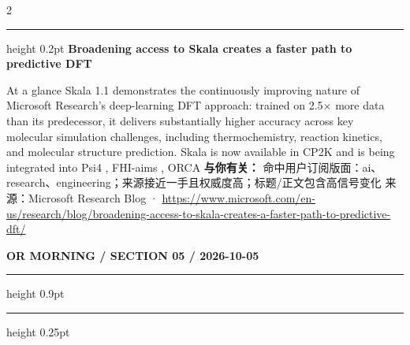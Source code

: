\documentclass[10.5pt]{ctexart}
\begin{document}
\begin{multicols}{2}
\vspace{2mm}
\hrule height 0.2pt
\vspace{2mm}
{\large\bfseries Broadening access to Skala creates a faster path to predictive DFT}\par
At a glance Skala 1.1 demonstrates the continuously improving nature of Microsoft Research’s deep-learning DFT approach: trained on 2.5× more data than its predecessor, it delivers substantially higher accuracy across key molecular simulation challenges, including thermochemistry, reaction kinetics, and molecular structure prediction. Skala is now available in CP2K and is being integrated into Psi4 , FHI-aims , ORCA 
\textbf{与你有关：} 命中用户订阅版面：ai、research、engineering；来源接近一手且权威度高；标题/正文包含高信号变化
{\footnotesize\color{ormuted} 来源：Microsoft Research Blog · \url{https://www.microsoft.com/en-us/research/blog/broadening-access-to-skala-creates-a-faster-path-to-predictive-dft/}}
\end{multicols}
\newpage
{\small\bfseries OR MORNING / SECTION 05 / 2026-10-05}
\vspace{2mm}
\hrule height 0.9pt
\vspace{1.5mm}
\hrule height 0.25pt
\vspace{4mm}
\end{document}
